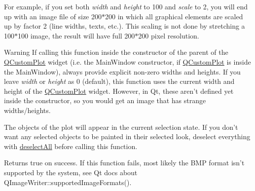 For example, if you set both {\itshape width} and {\itshape height} to 100 and {\itshape scale} to 2, you will end up with an image file of size 200$\ast$200 in which all graphical elements are scaled up by factor 2 (line widths, texts, etc.). This scaling is not done by stretching a 100$\ast$100 image, the result will have full 200$\ast$200 pixel resolution.

\begin{DoxyWarning}{Warning}
If calling this function inside the constructor of the parent of the \hyperlink{classQCustomPlot}{Q\-Custom\-Plot} widget (i.\-e. the Main\-Window constructor, if \hyperlink{classQCustomPlot}{Q\-Custom\-Plot} is inside the Main\-Window), always provide explicit non-\/zero widths and heights. If you leave {\itshape width} or {\itshape height} as 0 (default), this function uses the current width and height of the \hyperlink{classQCustomPlot}{Q\-Custom\-Plot} widget. However, in Qt, these aren't defined yet inside the constructor, so you would get an image that has strange widths/heights.
\end{DoxyWarning}
The objects of the plot will appear in the current selection state. If you don't want any selected objects to be painted in their selected look, deselect everything with \hyperlink{classQCustomPlot_a9d4808ab925b003054085246c92a257c}{deselect\-All} before calling this function.

Returns true on success. If this function fails, most likely the B\-M\-P format isn't supported by the system, see Qt docs about Q\-Image\-Writer\-::supported\-Image\-Formats().

